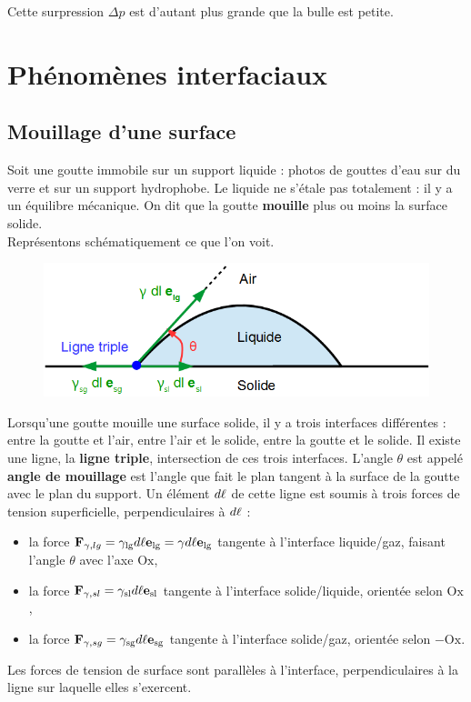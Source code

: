 \documentclass[11pt,a4paper]{report}
\begin{document}
Cette surpression $\Delta p$ est d'autant plus grande que la bulle est petite.


\newpage
\section{Phénomènes interfaciaux}

\subsection{Mouillage d'une surface}

Soit une goutte immobile sur un support liquide : photos de gouttes d'eau sur du verre et sur un support hydrophobe. Le liquide ne s'étale pas totalement : il y a un équilibre mécanique. On dit que la goutte \textbf{mouille} plus ou moins la surface solide.\\

Représentons schématiquement ce que l'on voit.\\

\begin{figure}[h!]
\begin{center}
	\includegraphics[scale = 0.5]{mouillage.png} 
	\label{fig:mouillage}
\end{center}
\end{figure}

Lorsqu'une goutte mouille une surface solide, il y a trois interfaces différentes : entre la goutte et l'air, entre l'air et le solide, entre la goutte et le solide. Il existe une ligne, la \textbf{ligne triple}, intersection de ces trois interfaces. L'angle $\theta$ est appelé \textbf{angle de mouillage} est l'angle que fait le plan tangent à la surface de la goutte avec le plan du support. Un élément $d\bold{\ell}$ de cette ligne est soumis à trois forces de tension superficielle, perpendiculaires à $d\bold{\ell}$ :
\begin{itemize}
	\item la force $\bold{F}_{\gamma,lg} = \gamma_\text{lg} d\ell \bold{e}_\text{lg} = \gamma d\ell \bold{e}_\text{lg}$ tangente à l'interface liquide/gaz, faisant l'angle $\theta$ avec l'axe $\text{Ox}$,
	\item la force $\bold{F}_{\gamma,sl} = \gamma_\text{sl} d\ell \bold{e}_\text{sl}$ tangente à l'interface solide/liquide, orientée selon $\text{Ox}$,
	\item la force $\bold{F}_{\gamma,sg} = \gamma_\text{sg} d\ell \bold{e}_\text{sg}$ tangente à l'interface solide/gaz, orientée selon $-\text{Ox}$.\\
\end{itemize}
Les forces de tension de surface sont parallèles à l'interface, perpendiculaires à la ligne sur laquelle elles s'exercent.
 
\end{document}
